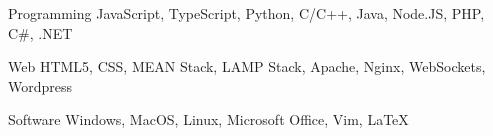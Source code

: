 


\begin{cvskills}


\cvskill
{Programming} %
{JavaScript, TypeScript, Python, C/C++, Java, Node.JS, PHP, C\#, .NET} %


\cvskill
{Web} %
{HTML5, CSS, MEAN Stack, LAMP Stack, Apache, Nginx, WebSockets, Wordpress} %


\cvskill
{Software} %
{Windows, MacOS, Linux, Microsoft Office, Vim, LaTeX} %


\end{cvskills}
